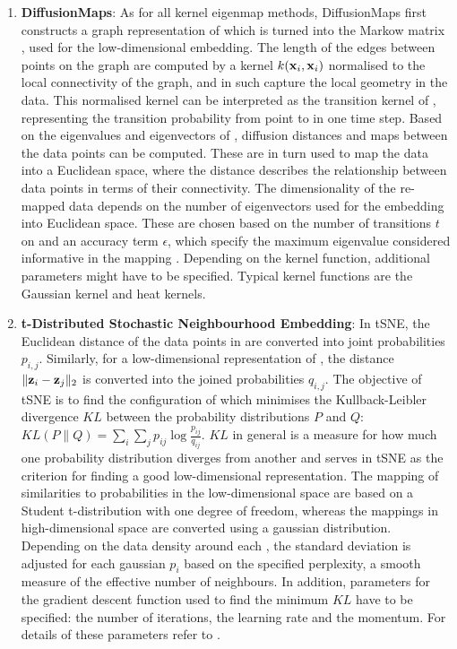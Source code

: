 \begin{enumerate}
\item\textbf{DiffusionMaps}: As for all kernel eigenmap methods, DiffusionMaps first constructs a graph representation of  which is turned into the Markow matrix , used for the low-dimensional embedding. The length of the edges between points on the graph are computed by a kernel \(k(\boldsymbol{\mathbf{x}}_{i},\boldsymbol{\mathbf{x}}_{i})\) normalised to the local connectivity of the graph, and in such capture the local geometry in the data. This normalised kernel can be interpreted as the transition kernel of , representing the transition probability from point  to  in one time step. Based on the eigenvalues and eigenvectors of , diffusion distances and maps between the data points can be computed. These are in turn used to map the data into a Euclidean space, where the distance describes the relationship between data points in terms of their connectivity. The dimensionality of the re-mapped data depends on the number of eigenvectors used for the embedding into Euclidean space. These are chosen based on the number of transitions \(t\) on  and an accuracy term \(\epsilon\), which specify the maximum eigenvalue considered informative in the mapping \citep{Coifman2005,Coifman2006}. Depending on the kernel function, additional parameters might have to be specified. Typical kernel functions are the Gaussian kernel and  heat kernels.

\item\textbf{t-Distributed Stochastic Neighbourhood Embedding}: In tSNE, the Euclidean distance of the data points in  are converted into joint probabilities \(p_{i,j}\). Similarly, for  a low-dimensional representation  of , the distance  \(\lVert \boldsymbol{\mathbf{z}}_{i} -\boldsymbol{\mathbf{z}}_{j}\rVert_2 \) is converted into the joined probabilities \(q_{i,j}\). The objective of tSNE is to find the configuration of  which minimises the Kullback-Leibler divergence \(KL\) between the probability distributions \(P\) and \(Q\): \(KL(P\lVert Q) = \sum_i \sum_j p_{ij}\log\frac{p_{ij}}{q_{ij}}\). \(KL\) in general is a measure for how much one probability distribution diverges from another \citep{Kullback1951} and serves in tSNE as the criterion for finding a good low-dimensional representation. The mapping of similarities to probabilities in the low-dimensional space are based on a Student t-distribution with one degree of freedom, whereas the mappings in high-dimensional space are converted using a gaussian distribution. Depending on the data density around each , the standard deviation is adjusted for each gaussian \(p_i\) based on the specified perplexity, a smooth measure of the effective number of neighbours. In addition, parameters for the gradient descent function used to find the minimum \(KL\) have to be specified:  the number of iterations, the learning rate and the momentum. For details of these parameters refer to \citep{Maaten2008}.
\end{enumerate}

